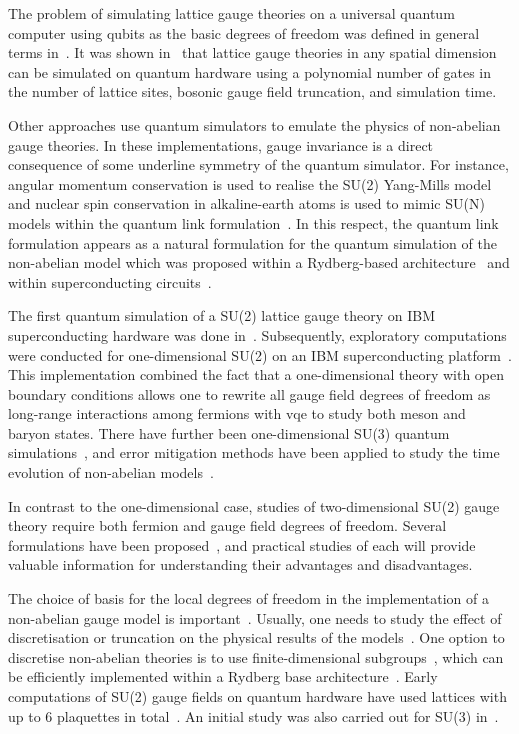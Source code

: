 The problem of simulating lattice gauge theories on a universal quantum computer using qubits as the basic degrees of freedom was defined in general terms in~\cite{Byrnes2006}. It was shown in~\cite{kan2021lattice} that lattice gauge theories in any spatial dimension can be simulated on quantum hardware using a polynomial number of gates in the number of lattice sites, bosonic gauge field truncation, and simulation time.

Other approaches use quantum simulators to emulate the physics of non-abelian gauge theories. In these implementations, gauge invariance is a direct consequence of some underline symmetry of the quantum simulator. For instance, angular momentum conservation is used to realise the SU(2) Yang-Mills model~\cite{Zohar2013a} and nuclear spin conservation in alkaline-earth atoms is used to mimic SU(N) models within the quantum link formulation~\cite{Banerjee2013}. In this respect, the quantum link formulation appears as a natural formulation for the quantum simulation of the non-abelian model which was proposed within a Rydberg-based architecture~\cite{Tagliacozzo2013a} and within superconducting circuits~\cite{mezzacapo2015non}.

The first quantum simulation of a SU(2) lattice gauge theory on IBM superconducting hardware was done in~\cite{Klco2019}. Subsequently, exploratory computations were conducted for one-dimensional SU(2) on an IBM superconducting platform~\cite{Atas2021}. This implementation combined the fact that a one-dimensional theory with open boundary conditions allows one to rewrite all gauge field degrees of freedom as long-range interactions among fermions with \gls{vqe} to study both meson and baryon states. There have further been one-dimensional SU(3) quantum simulations~\cite{farrell2022preparations,atas2022real,farrell2022preparationsb}, and error mitigation methods have been applied to study the time evolution of non-abelian models~\cite{rahman2022self}. 

In contrast to the one-dimensional case, studies of two-dimensional SU(2) gauge theory require both fermion and gauge field degrees of freedom. Several formulations have been proposed~\cite{raychowdhury2020loop,davoudi2021search}, and practical studies of each will provide valuable information for understanding their advantages and disadvantages.

The choice of basis for the local degrees of freedom in the implementation of a non-abelian gauge model is important~\cite{davoudi2022general,tong2022provably}. Usually, one needs to study the effect of discretisation or truncation on the physical results of the models~\cite{hartung2022digitising,jakobs2023canonical}. One option to discretise non-abelian theories is to use finite-dimensional subgroups~\cite{gustafson2022primitive,zohar2017digital,bender2018digital}, which can be efficiently implemented within a Rydberg base architecture~\cite{gonzalez2022hardware,gonzalez2023fermionic,zache2023quantum,zache2023fermion}. Early computations of SU(2) gauge fields on quantum hardware have used lattices with up to 6 plaquettes in total~\cite{Klco2019,rahman20212}. An initial study was also carried out for SU(3) in~\cite{Ciavarella2021}.  


